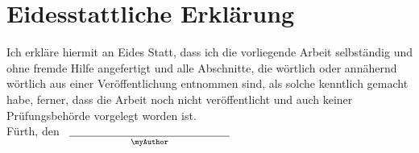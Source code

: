 


\section*{Eidesstattliche Erklärung}

 Ich erkläre hiermit an Eides Statt, dass ich die vorliegende Arbeit selbständig und ohne fremde Hilfe angefertigt und alle Abschnitte, die wörtlich oder annähernd wörtlich aus einer Veröffentlichung entnommen sind, als solche kenntlich gemacht habe, ferner, dass die Arbeit noch nicht veröffentlicht und auch keiner Prüfungsbehörde vorgelegt worden ist.\\[4cm]

\noindent
Fürth, den ~$\underset{\text{\myAuthor}}{\underline{\hspace{5cm}}}$
